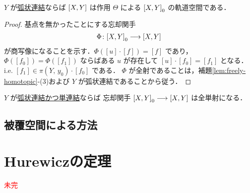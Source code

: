 \documentclass[algtopo_main]{subfiles}
\begin{document}
\begin{mytheo}[]{}
    $Y$ が\underline{弧状連結}ならば $\comm{X}{Y}$ は作用 $\Theta$ による $\comm{X}{Y}_0$ の軌道空間である．
\end{mytheo}

\begin{proof}
    基点を無かったことにする忘却関手
    \begin{align}
        \Phi \colon \comm{X}{Y}_0 \lto \comm{X}{Y}
    \end{align}
    が商写像になることを示す．$\Phi([u] \cdot [f]) = [f]$ であり，$\Phi([f_0]) = \Phi([f_1])$ ならばある $u$ が存在して $[u] \cdot [f_0] = [f_1]$ となる．i.e. $[f_1] \in \pi(Y,\, y_0) \cdot [f_0]$ である．
    $\Phi$ が全射であることは，補題\ref{lem:freely-homotopic}-(3)および $Y$ が弧状連結であることから従う．
\end{proof}

\begin{mycol}[]{}
    $Y$ が\underline{弧状連結かつ単連結}ならば
    忘却関手 $\comm{X}{Y}_0 \lto \comm{X}{Y}$ は全単射になる．
\end{mycol}


\subsection{被覆空間による方法}

\section{Hurewiczの定理}

\textcolor{red}{未完}
\end{document}
